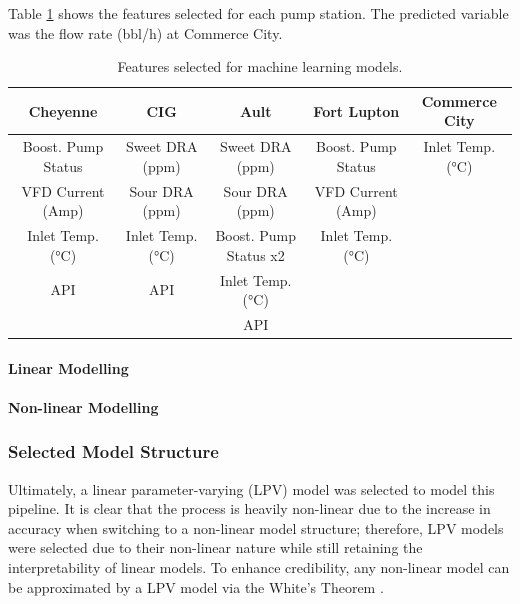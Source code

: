 Table \ref{tab:08featselect} shows the features selected for each pump station. The predicted variable was the flow rate (bbl/h) at Commerce City.

\begin{table}[h]
    \centering
    {\tiny
    {
    \begin{tabular}{ c | c | c | c | c}
        Cheyenne & CIG & Ault & Fort Lupton & Commerce City \\
        \hline
        Boost. Pump Status  &  Sweet DRA (ppm)  &  Sweet DRA (ppm)        &  Boost. Pump Status  & Inlet Temp. (°C) \\
        VFD Current (Amp)   &  Sour DRA (ppm)   &  Sour DRA (ppm)         &  VFD Current (Amp)   & \\
        Inlet Temp. (°C)    &  Inlet Temp. (°C) &  Boost. Pump Status x2  &  Inlet Temp. (°C)    & \\
        API                 &  API              &  Inlet Temp. (°C)       &             
        & \\
                            &                   &       API               &       
        & \\
        
    \end{tabular}}}
    \caption{Features selected for machine learning models.}
    \label{tab:08featselect}
\end{table}

\paragraph{Linear Modelling}
\paragraph{Non-linear Modelling}

\subsubsection{Selected Model Structure}
Ultimately, a linear parameter-varying (LPV) model was selected to model this pipeline.  It is clear that the process is heavily non-linear due to the increase in accuracy when switching to a non-linear model structure; therefore, LPV models were selected due to their non-linear nature while still retaining the interpretability of linear models. To enhance credibility, any non-linear model can be approximated by a LPV model via the White's Theorem \cite{LPV}.

